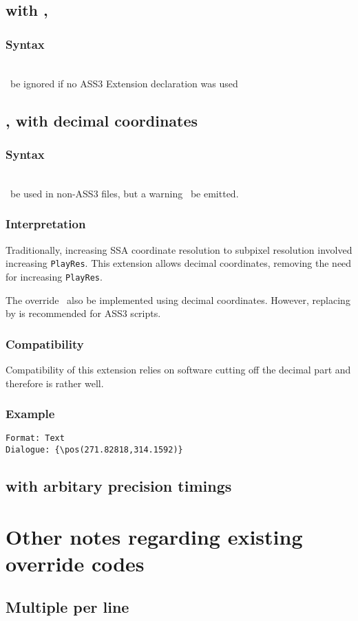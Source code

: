 \documentclass{spec}
\newcommand{\syntax}[1]{
	\subsubsection*{Syntax}
	\begin{tabbing}
	\hspace{2cm}\=\\[-16pt]
	#1
	\end{tabbing}
}
\newcommand{\mustuse}{\must\ be ignored if no ASS3 Extension declaration was used}
\newcommand{\mayuse}{\may\ be used in non-ASS3 files, but a warning \should\ be emitted.}
\begin{document}
\subsection{\todo {} with , }
\syntax{\mustuse}

\subsection{,  with decimal coordinates}
\syntax{\mayuse}

\subsubsection*{Interpretation}
Traditionally, increasing SSA coordinate resolution to subpixel
resolution involved increasing \texttt{PlayRes}. This extension
allows decimal coordinates, removing the need for increasing
\texttt{PlayRes}.

The  override \should\ also be implemented using
decimal coordinates. However, replacing  by
 is recommended for ASS3 scripts.

\subsubsection*{Compatibility}
Compatibility of this extension relies on software cutting off
the decimal part and therefore is rather well.
 
\subsubsection*{Example}
\begin{verbatim}
Format: Text
Dialogue: {\pos(271.82818,314.1592)}
\end{verbatim}

\subsection{\todo {} with arbitary precision timings}

\section{Other notes regarding existing override codes}
\subsection{\todo Multiple  per line}
\end{document}
